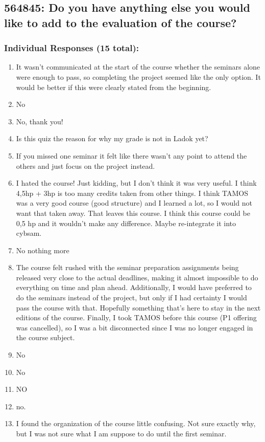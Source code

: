 \documentclass[a4paper]{report}
\begin{document}
\subsection{564845: Do you have anything else you would like to add to the evaluation of the course?}

\subsubsection{Individual Responses (15 total):}

\begin{enumerate}
  \item It wasn't communicated at the start of the course whether the seminars alone were enough to pass, so completing the project seemed like the only option. It would be better if this were clearly stated from the beginning.
  \item No
  \item No, thank you!
  \item Is this quiz the reason for why my grade is not in Ladok yet?
  \item If you missed one seminar it felt like there wasn't any point to attend the others and just focus on the project instead.
  \item I hated the course! Just kidding, but I don't think it was very useful. I think 4,5hp + 3hp is too many credits taken from other things. I think TAMOS was a very good course (good structure) and I learned a lot, so I would not want that taken away. That leaves this course. I think this course could be 0,5 hp and it wouldn't make any difference. Maybe re-integrate it into cybsam.
  \item No nothing more
  \item The course felt rushed with the seminar preparation assignments being released very close to the actual deadlines, making it almost impossible to do everything on time and plan ahead.  Additionally, I would have preferred to do the seminars instead of the project, but only if I had certainty I would pass the course with that. Hopefully something that's here to stay in the next editions of the course.  Finally, I took TAMOS before this course (P1 offering was cancelled), so I was a bit disconnected since I was no longer engaged in the course subject.
  \item No
  \item No
  \item NO
  \item no.
  \item I found the organization of the course little confusing. Not sure exactly why, but I was not sure what I am suppose to do until the first seminar.

\end{enumerate}
\end{document}
